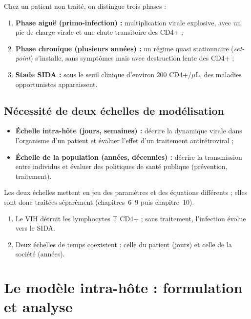 \documentclass[11pt,a4paper]{report}
\theoremstyle{plain}
\theoremstyle{definition}
\theoremstyle{remark}
\begin{document}
Chez un patient non traité, on distingue trois phases :
\begin{enumerate}
    \item \textbf{Phase aiguë (primo-infection) :} multiplication virale explosive, avec un pic de charge virale et une chute transitoire des CD4+ ;
    \item \textbf{Phase chronique (plusieurs années) :} un régime quasi stationnaire (\textit{set-point}) s'installe, sans symptômes mais avec destruction lente des CD4+ ;
    \item \textbf{Stade SIDA :} sous le seuil clinique d'environ $200$ CD4+/$\mu$L, des maladies opportunistes apparaissent.
\end{enumerate}

\section{Nécessité de deux échelles de modélisation}

\begin{itemize}
    \item \textbf{Échelle intra-hôte (jours, semaines) :} décrire la dynamique virale dans l'organisme d'un patient et évaluer l'effet d'un traitement antirétroviral ;
    \item \textbf{Échelle de la population (années, décennies) :} décrire la transmission entre individus et évaluer des politiques de santé publique (prévention, traitement).
\end{itemize}
Les deux échelles mettent en jeu des paramètres et des équations différents ; elles sont donc traitées séparément (chapitres~6--9 puis chapitre~10).

\begin{encadreresume}
\begin{enumerate}
    \item Le VIH détruit les lymphocytes T CD4+ ; sans traitement, l'infection évolue vers le SIDA.
    \item Deux échelles de temps coexistent : celle du patient (jours) et celle de la société (années).
\end{enumerate}
\end{encadreresume}

\chapter{Le modèle intra-hôte : formulation et analyse}
\end{document}
